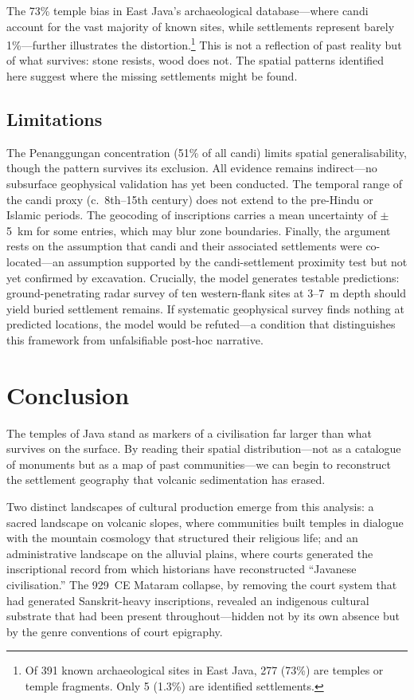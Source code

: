 \documentclass[12pt,a4paper]{article}
\begin{document}
The 73\% temple bias in East Java's archaeological database---where candi account for the vast majority of known sites, while settlements represent barely 1\%---further illustrates the distortion.\footnote{Of 391 known archaeological sites in East Java, 277 (73\%) are temples or temple fragments. Only 5 (1.3\%) are identified settlements.}
This is not a reflection of past reality but of what survives: stone resists, wood does not.
The spatial patterns identified here suggest where the missing settlements might be found.

\subsection{Limitations}

The Penanggungan concentration (51\% of all candi) limits spatial generalisability, though the pattern survives its exclusion.
All evidence remains indirect---no subsurface geophysical validation has yet been conducted.
The temporal range of the candi proxy (c.~8th--15th century) does not extend to the pre-Hindu or Islamic periods.
The geocoding of inscriptions carries a mean uncertainty of $\pm$5~km for some entries, which may blur zone boundaries.
Finally, the argument rests on the assumption that candi and their associated settlements were co-located---an assumption supported by the candi-settlement proximity test but not yet confirmed by excavation.
Crucially, the model generates testable predictions: ground-penetrating radar survey of ten western-flank sites at 3--7~m depth should yield buried settlement remains.
If systematic geophysical survey finds nothing at predicted locations, the model would be refuted---a condition that distinguishes this framework from unfalsifiable post-hoc narrative.


\section{Conclusion}

The temples of Java stand as markers of a civilisation far larger than what survives on the surface.
By reading their spatial distribution---not as a catalogue of monuments but as a map of past communities---we can begin to reconstruct the settlement geography that volcanic sedimentation has erased.

Two distinct landscapes of cultural production emerge from this analysis: a sacred landscape on volcanic slopes, where communities built temples in dialogue with the mountain cosmology that structured their religious life; and an administrative landscape on the alluvial plains, where courts generated the inscriptional record from which historians have reconstructed ``Javanese civilisation.''
The 929~CE Mataram collapse, by removing the court system that had generated Sanskrit-heavy inscriptions, revealed an indigenous cultural substrate that had been present throughout---hidden not by its own absence but by the genre conventions of court epigraphy.
\end{document}

